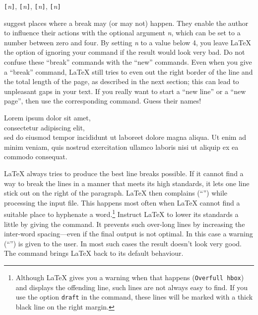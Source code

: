 \begin{lscommand}
\verb|[|\emph{n}\verb|]|,
\verb|[|\emph{n}\verb|]|,
\verb|[|\emph{n}\verb|]|,
\verb|[|\emph{n}\verb|]|
\end{lscommand}
suggest places where a break may (or may not) happen.
They enable the author to influence their
actions with the optional argument \emph{n}, which can be set to a number
between zero and four. By setting \emph{n} to a value below 4, you leave
\LaTeX{} the option of ignoring your command if the result would look very
bad. Do not confuse these ``break'' commands with the ``new'' commands. Even
when you give a ``break'' command, \LaTeX{} still tries to even out the
right border of the line and the total length of the page, as described in
the next section; this can lead to unpleasant gaps in your text.
If you really want to start a ``new line'' or a ``new page'', then use the
corresponding command. Guess their names!
\begin{example}[examplewidth=0.4\linewidth]
  Lorem ipsum dolor sit amet,\\
  consectetur adipiscing elit,\\[1cm]
  sed do eiusmod tempor\linebreak
  incididunt ut labore\linebreak[1]
  et dolore magna aliqua. Ut enim
  ad minim veniam, quis \linebreak[3]
  nostrud exercitation ullamco laboris
  nisi ut aliquip\linebreak
   ex ea commodo consequat. 
\end{example}

\LaTeX{} always tries to produce the best line breaks possible. If it
cannot find a way to break the lines in a manner that meets its high
standards, it lets one line stick out on the right of the paragraph.
\LaTeX{} then complains (``'') while processing the
input file. This happens most often when \LaTeX{} cannot find a
suitable place to hyphenate a word.\footnote{Although \LaTeX{} gives
  you a warning when that happens (\texttt{Overfull \bs{}hbox}) and displays the
  offending line, such lines are not always easy to find. If you use
  the option \texttt{draft} in the  command, these
  lines will be marked with a thick black line on the right margin.}
Instruct \LaTeX{} to lower its standards a little by giving
the  command. It prevents such over-long lines by
increasing the inter-word spacing---even if the final output is not
optimal.  In this case a warning (``'') is given to
the user.  In most such cases the result doesn't look very good. The
command  brings \LaTeX{} back to its default behaviour.

